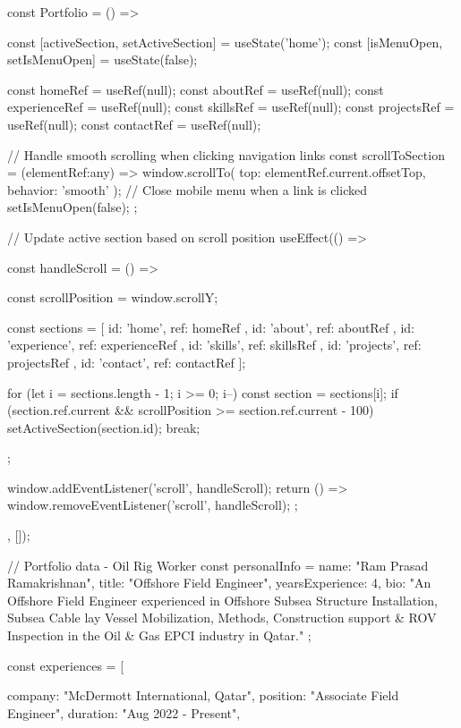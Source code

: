 const Portfolio = () => {
  const [activeSection, setActiveSection] = useState('home');
  const [isMenuOpen, setIsMenuOpen] = useState(false);
  
  const homeRef = useRef(null);
  const aboutRef = useRef(null);
  const experienceRef = useRef(null);
  const skillsRef = useRef(null);
  const projectsRef = useRef(null);
  const contactRef = useRef(null);
  
  // Handle smooth scrolling when clicking navigation links
  const scrollToSection = (elementRef:any) => {
    window.scrollTo({
      top: elementRef.current.offsetTop,
      behavior: 'smooth'
    });
    // Close mobile menu when a link is clicked
    setIsMenuOpen(false);
  };
  
  // Update active section based on scroll position
  useEffect(() => {
    const handleScroll = () => {
      const scrollPosition = window.scrollY;
      
      const sections = [
        { id: 'home', ref: homeRef },
        { id: 'about', ref: aboutRef },
        { id: 'experience', ref: experienceRef },
        { id: 'skills', ref: skillsRef },
        { id: 'projects', ref: projectsRef },
        { id: 'contact', ref: contactRef }
      ];
      
      for (let i = sections.length - 1; i >= 0; i--) {
        const section = sections[i];
        if (section.ref.current && scrollPosition >= section.ref.current - 100) {
          setActiveSection(section.id);
          break;
        }
      }
    };
    
    window.addEventListener('scroll', handleScroll);
    return () => {
      window.removeEventListener('scroll', handleScroll);
    };
  }, []);
  

  // Portfolio data - Oil Rig Worker
  const personalInfo = {
    name: "Ram Prasad Ramakrishnan",
    title: "Offshore Field Engineer",
    yearsExperience: 4,
    bio: "An Offshore Field Engineer experienced in Offshore Subsea Structure Installation,  Subsea Cable lay Vessel Mobilization, Methods, Construction support  & ROV Inspection in the Oil & Gas EPCI industry in Qatar."
  };
  
  const experiences = [
    {
      company: "McDermott International, Qatar",
      position: "Associate Field Engineer",
      duration: "Aug 2022 - Present",
      
}}
